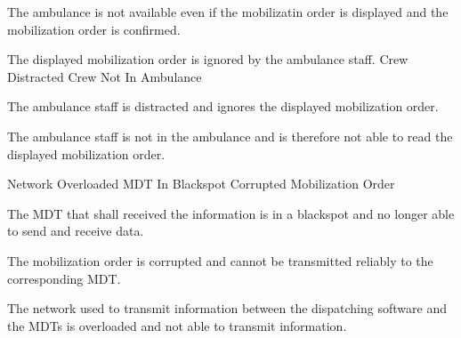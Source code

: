   \startkaosspec
  	 {The ambulance is not available even if the mobilizatin order is displayed and the mobilization order is confirmed.}
  \stopkaosspec
  
  \startkaosspec
  	 {The displayed mobilization order is ignored by the ambulance staff.}
  	 {Crew Distracted}
  	 {Crew Not In Ambulance}
  \stopkaosspec
  
  \startkaosspec
  	 {The ambulance staff is distracted and ignores the displayed mobilization order.}
  \stopkaosspec
  
  \startkaosspec
  	 {The ambulance staff is not in the ambulance and is therefore not able to read the displayed mobilization order.}
  \stopkaosspec
  
  
    {}

  \startkaosspec
  	 {}
  	 {Network Overloaded}
  	 {MDT In Blackspot}
  	 {Corrupted Mobilization Order}
  \stopkaosspec
  
  \startkaosspec
  	 {The MDT that shall received the information is in a blackspot and no longer able to send and receive data.}
  \stopkaosspec
  
  \startkaosspec
  	 {The mobilization order is corrupted and cannot be transmitted reliably to the corresponding MDT.}
  \stopkaosspec
  
  \startkaosspec
  	 {The network used to transmit information between the dispatching software and the MDTs is overloaded and not able to transmit information.}
  \stopkaosspec
  
  
